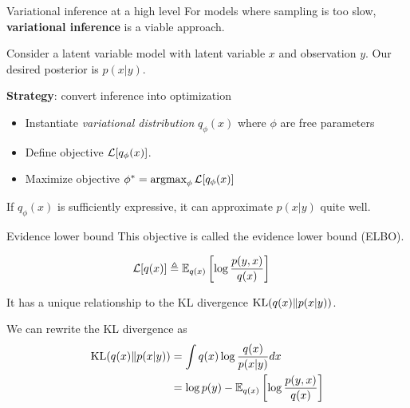\documentclass[10pt, compress]{beamer}
\begin{document}
\begin{frame}{Variational inference at a high level}
  For models where sampling is too slow,
  \textbf{variational inference}
  is a viable approach.

  \pause
    Consider a latent variable model with latent variable 
    $x$ and observation $y$. Our desired
    posterior is $p(x | y)$.

    \pause
    \textbf{Strategy}: convert inference into optimization
    \begin{itemize}
        \pause
      \item Instantiate \emph{variational distribution} $q_\phi(x)$
        where $\phi$ are free parameters
        \pause
      \item Define objective $\mathcal{L}[q_\phi(x)]$.
        \pause
      \item Maximize objective $\phi^* = \operatorname*{argmax}_\phi \mathcal{L}[q_\phi(x)]$
    \end{itemize}
    \pause
    If $q_\phi(x)$ is sufficiently expressive,
    it can approximate $p(x | y)$ quite well.
\end{frame}

\begin{frame}{Evidence lower bound}
  This objective is called the \alert{evidence lower bound} (ELBO).
  
  \pause
  
  \begin{align*}
    \mathcal{L}[q(x)] &\triangleq \mathbb{E}_{q(x)}\left[\log\frac{p(y, x)}{q(x)}\right]
  \end{align*}

  It has a unique relationship to the KL divergence $\textrm{KL}(q(x)\|p(x|y))$.

  We can rewrite the KL divergence as
  \begin{align*}
    \textrm{KL}(q(x)\|p(x|y)) &= \int q(x)\log\frac{q(x)}{p(x | y)}dx \\
              &= \log p(y) - \mathbb{E}_{q(x)}\left[\log\frac{p(y, x)}{q(x)}\right]
  \end{align*}
  
\end{frame}
\end{document}
